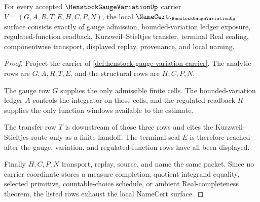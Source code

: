 \begin{theorem}
\label{thm:henstock-gauge-variation-namecert-obligations}
For every accepted $\HenstockGaugeVariationUp$ carrier $V=(G,A,R,T,E,H,C,P,N)$, the local $\NameCert_{\HenstockGaugeVariationUp}$ surface consists exactly of gauge admission, bounded-variation ledger exposure, regulated-function readback, Kurzweil--Stieltjes transfer, terminal Real sealing, componentwise transport, displayed replay, provenance, and local naming.
\end{theorem}
\begin{proof}
Project the carrier of \autoref{def:henstock-gauge-variation-carrier}. The analytic rows are $G,A,R,T,E$, and the structural rows are $H,C,P,N$.

The gauge row $G$ supplies the only admissible finite cells. The bounded-variation ledger $A$ controls the integrator on those cells, and the regulated readback $R$ supplies the only function windows available to the estimate.

The transfer row $T$ is downstream of those three rows and cites the Kurzweil--Stieltjes route only as a finite handoff. The terminal seal $E$ is therefore reached after the gauge, variation, and regulated-function rows have all been displayed.

Finally $H,C,P,N$ transport, replay, source, and name the same packet. Since no carrier coordinate stores a measure completion, quotient integrand equality, selected primitive, countable-choice schedule, or ambient Real-completeness theorem, the listed rows exhaust the local NameCert surface.
\end{proof}

